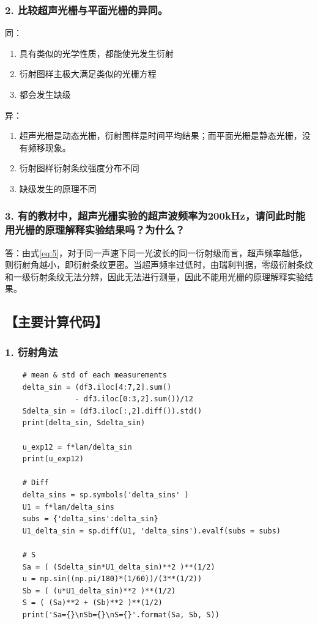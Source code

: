 \documentclass[12pt,a4paper,UTF8]{ctexart}
\begin{document}
	\subsubsection*{2. 比较超声光栅与平面光栅的异同。}
		同：
		\begin{enumerate}[label=\arabic*.]
			\item 具有类似的光学性质，都能使光发生衍射
			\item 衍射图样主极大满足类似的光栅方程
			\item 都会发生缺级
		\end{enumerate}
		
		异：
		\begin{enumerate}[label=\arabic*.]
			\item 超声光栅是动态光栅，衍射图样是时间平均结果；而平面光栅是静态光栅，没有频移现象。
			\item 衍射图样衍射条纹强度分布不同
			\item 缺级发生的原理不同
		\end{enumerate}
	\subsubsection*{3. 有的教材中，超声光栅实验的超声波频率为200kHz，请问此时能用光栅的原理解释实验结果吗？为什么？}
		答：由式\ref{eq:5}，对于同一声速下同一光波长的同一衍射级而言，超声频率越低，则衍射角越小，即衍射条纹更密。当超声频率过低时，由瑞利判据，零级衍射条纹和一级衍射条纹无法分辨，因此无法进行测量，因此不能用光栅的原理解释实验结果。

\subsection*{【主要计算代码】}
\subsubsection*{1. 衍射角法}
\label{sec:code1}
\begin{lstlisting}
	# mean & std of each measurements
	delta_sin = (df3.iloc[4:7,2].sum() 
	            - df3.iloc[0:3,2].sum())/12  
	Sdelta_sin = (df3.iloc[:,2].diff()).std()
	print(delta_sin, Sdelta_sin)
	
	u_exp12 = f*lam/delta_sin
	print(u_exp12)
	
	# Diff
	delta_sins = sp.symbols('delta_sins' ) 
	U1 = f*lam/delta_sins
	subs = {'delta_sins':delta_sin} 
	U1_delta_sin = sp.diff(U1, 'delta_sins').evalf(subs = subs)
	
	# S
	Sa = ( (Sdelta_sin*U1_delta_sin)**2 )**(1/2)
	u = np.sin((np.pi/180)*(1/60))/(3**(1/2)) 
	Sb = ( (u*U1_delta_sin)**2 )**(1/2)
	S = ( (Sa)**2 + (Sb)**2 )**(1/2)
	print('Sa={}\nSb={}\nS={}'.format(Sa, Sb, S))
\end{lstlisting}
\end{document}
